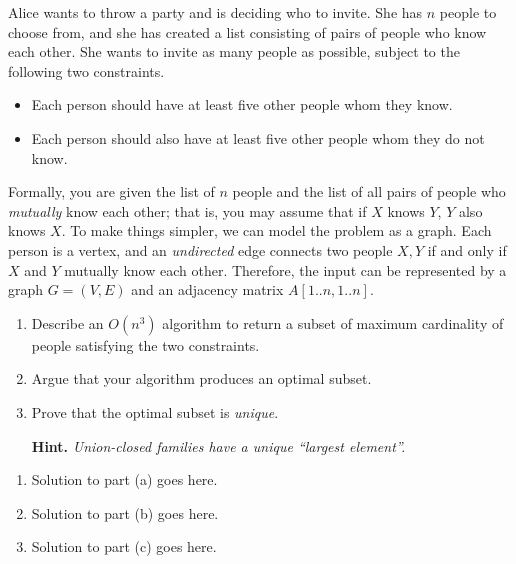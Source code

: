 \documentclass{article}
\begin{document}
\begin{question}
Alice wants to throw a party and is deciding who to invite. She has $n$ people to choose from, and she has created a list consisting of pairs of people who know each other. She wants to invite as many people as possible, subject to  the following two constraints.
\begin{itemize}
    \item Each person should have at least five other people whom they know.
    \item Each person should also have at least five other people whom they do not know.
\end{itemize}

Formally, you are given the list of $n$ people and the list of all pairs of people who {\em mutually} know each other; that is, you may assume that if $X$ knows $Y$, $Y$ also knows $X$. To make things simpler, we can model the problem as a graph. Each person is a vertex, and an {\em undirected} edge connects two people $X, Y$ if and only if $X$ and $Y$ mutually know each other. Therefore, the input can be represented by a graph $G = (V, E)$ and an adjacency matrix $A[1..n, 1..n]$.

\begin{enumerate}[label = (\alph*)]
    \item Describe an $O(n^3)$ algorithm to return a subset of maximum cardinality of people satisfying the two constraints.

    \item Argue that your algorithm produces an optimal subset.

    \item Prove that the optimal subset is {\em unique}.

    {\bfseries Hint.} {\em Union-closed families have a unique ``largest element''.}
\end{enumerate}
\end{question}

\begin{solution}
\begin{enumerate}[label = (\alph*)]
    \item Solution to part (a) goes here.

    \item Solution to part (b) goes here.

    \item Solution to part (c) goes here.
\end{enumerate}
\end{solution}
\end{document}
